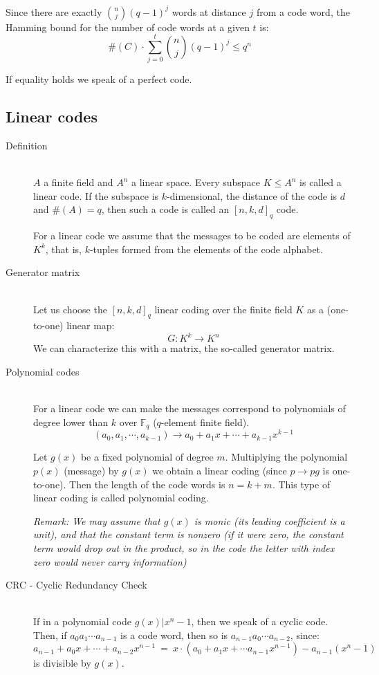 \documentclass[margin=0px]{article}
\begin{document}
\begin{description}
        Since there are exactly $\binom{n}{j}(q-1)^j$ words at distance $j$ from a code word, the Hamming bound for the number of code words at a given $t$ is:
        \[\#(C) \cdot \sum\limits_{j=0}^{t}\binom{n}{j}(q-1)^j \leq q^n \]

        If equality holds we speak of a perfect code.
\end{description}
\subsection{Linear codes}
\begin{description}
    \item[Definition] \hfill \\
        $A$ a finite field and $A^n$ a linear space. Every subspace $ K \leq A^n$ is called a linear code. If the subspace is $k$-dimensional, the distance of the code is $d$ and $\#(A) = q$, then such a code is called an $[n,k,d]_q$ code.

        For a linear code we assume that the messages to be coded are elements of $K^k$, that is, $k$-tuples formed from the elements of the code alphabet.
    \item[Generator matrix] \hfill \\
        Let us choose the $[n,k,d]_q$ linear coding over the finite field $K$ as a (one-to-one) linear map:
        \[ G:K^k \rightarrow K^n \]
        We can characterize this with a matrix, the so-called generator matrix.
    \item[Polynomial codes] \hfill \\
        For a linear code we can make the messages correspond to polynomials of degree lower than $k$ over $\mathbb{F}_q$ ($q$-element finite field).
        \[(a_0,a_1,\cdots,a_{k-1}) \rightarrow a_0+a_1x+\cdots+a_{k-1}x^{k-1} \]

        Let $g(x)$ be a fixed polynomial of degree $m$. Multiplying the polynomial $p(x)$ (message) by $g(x)$ we obtain a linear coding (since $p \rightarrow pg$ is one-to-one). Then the length of the code words is $n=k+m$. This type of linear coding is called polynomial coding.

        \textit{Remark: We may assume that $g(x)$ is monic (its leading coefficient is a unit), and that the constant term is nonzero (if it were zero, the constant term would drop out in the product, so in the code the letter with index zero would never carry information)}
    \item[CRC - Cyclic Redundancy Check] \hfill \\
        If in a polynomial code $g(x) | x^n-1$, then we speak of a cyclic code. Then, if $a_0a_1\cdots a_{n-1}$ is a code word, then so is $a_{n-1}a_0\cdots a_{n-2}$, since:
        \[ a_{n-1}+a_0x+\cdots+a_{n-2}x^{n-1} \ = \ x\cdot(a_0+a_1x+\cdots a_{n-1}x^{n-1})-a_{n-1}(x^n-1) \]
        is divisible by $g(x)$.


\end{description}
\end{document}
